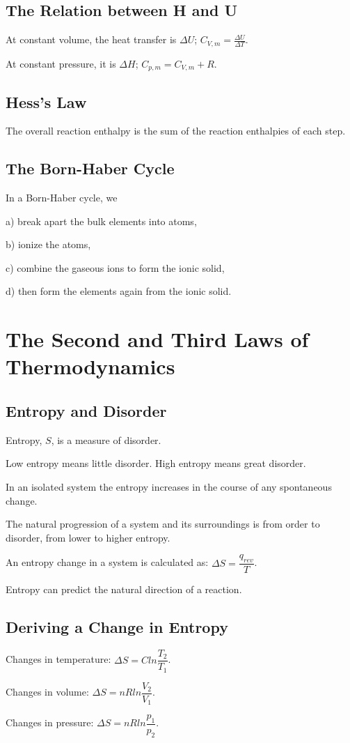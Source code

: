 \documentclass[a4paper,12pt]{article}
\begin{document}
\subsection{The Relation between H and U}
At constant volume, the heat transfer is $\Delta U$; $C_{V,m}=\frac{ \Delta U}{\Delta T}$.\par
At constant pressure, it is $\Delta H$; $C_{p,m} = C_{V,m} + R$.\par
\subsection{Hess’s Law}
The overall reaction enthalpy is the sum of the reaction enthalpies of each step.
\subsection{The Born-Haber Cycle}
In a Born-Haber cycle, we\par
a) break apart the bulk elements into atoms,\par
b) ionize the atoms,\par
c) combine the gaseous ions to form the ionic solid,\par
d) then form the elements again from the ionic solid.

\newpage
\section{The Second and Third Laws of Thermodynamics}
\subsection{Entropy and Disorder}
Entropy, $S$, is a measure of disorder.\par
Low entropy means little disorder.
High entropy means great disorder.\par
In an isolated system the entropy increases in the course of any spontaneous change.\par
The natural progression of a system and its surroundings is from order to disorder, from lower to higher entropy.\par
An entropy change in a system is calculated as: $\Delta S = \dfrac{q_{rev}}{T}$.\par
Entropy can predict the natural direction of a reaction.
\subsection{Deriving a Change in Entropy}
Changes in temperature: $\Delta S=Cln\dfrac{T_{2}}{T_{1}}$.\par
Changes in volume: $\Delta S=nRln\dfrac{V_{2}}{V_{1}}$.\par
Changes in pressure: $\Delta S=nRln\dfrac{p_{1}}{p_{2}}$.
\end{document}
